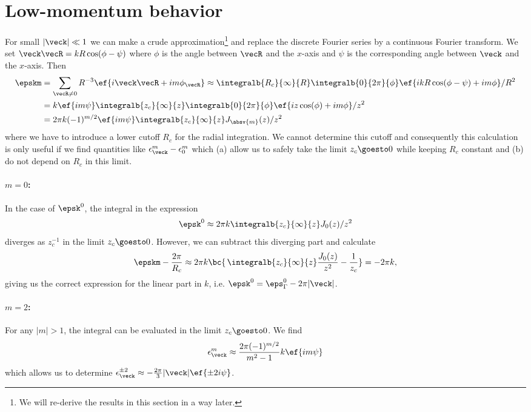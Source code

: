 \section{Low-momentum behavior}
For small $|\veck| \ll 1$ we can make a crude approximation\footnote{We will re-derive the results in this section in a  way later.} and replace the discrete Fourier series
by a continuous Fourier transform. We set $\veck\vecR = k R \cos(\phi-\psi)$ where
$\phi$ is the angle between $\vecR$ and the $x$-axis and $\psi$ is the
corresponding angle between $\veck$ and the $x$-axis. Then
\begin{align}
    \epskm &= \sum_{\vecR\ne 0} R^{-3} \ef{i\veck\vecR+i m \phi_\vecR}
    \approx \integralb{R_c}{\infty}{R} \integralb{0}{2\pi}{\phi} \ef{ikR \cos(\phi-\psi) + i m \phi} / R^2\\
    &= k \ef{im \psi} \integralb{z_c}{\infty}{z} \integralb{0}{2\pi}{\phi} \ef{i z \cos(\phi) + i m \phi} / z^2\\
    &= 2\pi k (-1)^{m/2} \ef{i m \psi} \integralb{z_c}{\infty}{z} J_{\absv{m}}(z)/z^2
\end{align}
where we have to introduce a lower cutoff $R_c$ for the radial integration.
We cannot determine this cutoff and consequently this calculation is only useful
if we find quantities like $\epsilon_{\veck}^m-\epsilon^m_0$ which (a) allow
us to safely take the limit $z_c \goesto 0$ while keeping $R_c$ constant and
(b) do not depend on $R_c$ in this limit.

\paragraph{$m=0$:} In the case of $\epsk^0$, the integral in the expression
\begin{align}
    \epsk^0 \approx 2\pi k \integralb{z_c}{\infty}{z} J_0(z)/z^2
\end{align}
diverges as $z_c^{-1}$ in the limit $z_c \goesto 0$. However, we can subtract this diverging part and calculate
\begin{align}
    \epskm - \frac{2\pi}{R_c} \approx 2\pi k \bc{ \, \integralb{z_c}{\infty}{z} \frac{J_0(z)}{z^2} - \frac{1}{z_c} } = -2\pi k,
\end{align}
giving us the correct expression for the linear part in $k$, i.e. $\epsk^0=\eps_\Gamma^0 - 2\pi |\veck|$.

\paragraph{$m=2$:} For any $|m|>1$, the integral can be evaluated in the limit $z_c\goesto 0$. We find
\begin{align}
    \epsilon^m_{\veck} \approx \frac{2\pi (-1)^{m/2}}{m^2-1} k \ef{im \psi}
\end{align}
which allows us to determine $\epsilon^{\pm 2}_{\veck} \approx -\frac{2\pi}{3} |\veck| \ef{\pm 2 i \psi}$.

